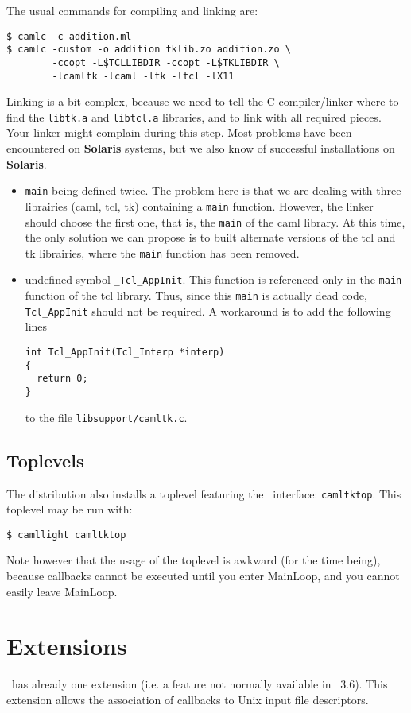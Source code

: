 The usual commands for compiling and linking are:
\begin{verbatim}
$ camlc -c addition.ml
$ camlc -custom -o addition tklib.zo addition.zo \
        -ccopt -L$TCLLIBDIR -ccopt -L$TKLIBDIR \
        -lcamltk -lcaml -ltk -ltcl -lX11
\end{verbatim}
Linking is a bit complex, because we need to tell the C compiler/linker
where to find the \verb|libtk.a| and \verb|libtcl.a| libraries, and to link
with all required pieces. Your linker might complain during this step.
Most problems have been encountered on {\bf Solaris} systems, but we also
know of successful installations on {\bf Solaris}.
\begin{itemize}
\item \verb|main| being defined twice. The problem here is that we are
dealing with three librairies (caml, tcl, tk) containing a \verb|main|
function. However, the linker should choose the first one, that is, the
\verb|main| of the caml library. At this time, the only solution we can
propose is to built alternate versions of the tcl and tk librairies, where
the \verb|main| function has been removed.

\item undefined symbol \verb|_Tcl_AppInit|. This function is referenced only
in the \verb|main| function of the tcl library. Thus, since this \verb|main|
is actually dead code, \verb|Tcl_AppInit| should not be required. A
workaround is to add the following lines
\begin{verbatim}
int Tcl_AppInit(Tcl_Interp *interp)
{
  return 0;
}
\end{verbatim} 
to the file \verb|libsupport/camltk.c|.
\end{itemize} 


\subsection{Toplevels}
The distribution also installs a toplevel featuring the \camltk\
interface: \verb|camltktop|.
This toplevel may be run with: 
\begin{verbatim}
$ camllight camltktop
\end{verbatim} 
Note however that the usage of the toplevel is awkward (for the time
being), because callbacks cannot be executed until you enter MainLoop, and
you cannot easily leave MainLoop.

\section{Extensions}
\camltk\ has already one extension (i.e. a feature not normally available in
\tk\ 3.6). This extension allows the association of callbacks to Unix input
file descriptors.

